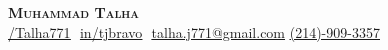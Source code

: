 \begin{description}
    \item 
        \begin{center}
            \textbf{\Huge \scshape Muhammad Talha} \\ \vspace{8pt}
            \small 
            \href{https://github.com/Talha771}
            {\underline{/Talha771}} $  $
            \href{https://linkedin.com/in/tjbravo}{\underline{in/tjbravo}} $  $
            \href{mailto:talha.j771@gmail.com}
            {\underline{talha.j771@gmail.com}}
            \href{tel:0012149093357}{\underline{(214)-909-3357}}
        \end{center}
\end{description}
   
